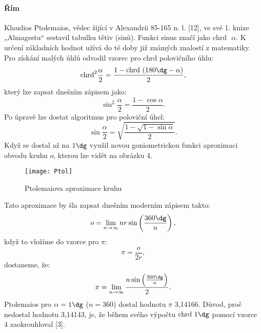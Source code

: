 \documentclass[rocnikovka]{gzwroc} %
\begin{document}
\paragraph{Řím}
Klaudios Ptolemaios, vědec žijící v Alexandrii 85-165 n. l. [12], ve své 1. knize „Almagestu“ sestavil tabulku tětiv (sinů). Funkci sinus značí jako $\mathrm{chrd} \textrm{ }\alpha$. K určení základních hodnot užívá do té doby již známých znalostí z matematiky. Pro získání malých úhlů odvodil vzorec pro $\mathrm{chrd}$ polovičního úhlu:
$$
\mathrm{chrd}^2\frac{\alpha}{2}=\frac{1-\mathrm{chrd}\textrm{ }(180\dg-\alpha)}{2},
$$
který lze zapsat dnešním zápisem jako:
\begin{equation}
\sin^2\frac{\alpha}{2}=\frac{1-\cos\alpha}{2}.
\end{equation}
Po úpravě lze dostat algoritmus pro poloviční úhel:
$$
\sin\frac{\alpha}{2}=\sqrt{\frac{1-\sqrt{1-\sin\alpha}}{2}}.
$$
Když se dostal až na  $1\dg$ využil novou goniometrickou funkci aproximaci obvodu kruhu $o$, kterou lze vidět na obrázku 4.
\begin{figure}[!ht]
\texttt{[image: Ptol]}
\caption{Ptolemaiova aproximace kruhu}
\label{fig:kruh}
\end{figure}
Tato aproximace by šla zapsat dnešním moderním zápisem takto:
$$
o=\lim_{n\to\infty} nr\sin\left(\frac{360\dg}{n}\right),
$$
když to  vložíme do vzorce pro $\pi$:
$$
\pi=\frac{o}{2r},
$$
dostaneme, že:
\begin{equation}
\pi=\lim_{n\to\infty}\frac{n\sin\left(\frac{360\dg}{n}\right)}{2}.
\end{equation}
Ptolemaios pro $\alpha = 1\dg$ ($n=360$) dostal hodnotu $\pi$ 3,14166. Důvod, proč nedostal hodnotu 3,14143, je, že během svého výpočtu $\mathrm{chrd} \textrm{ }1\dg$ pomocí vzorce 4 zaokrouhloval [3].
\end{document}
